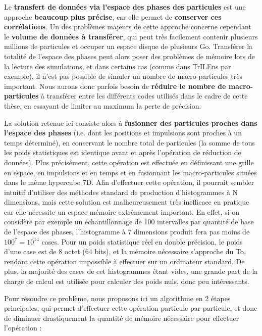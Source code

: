 \begin{refsection}
Le \textbf{transfert de données via l'espace des phases des particules} est une approche \textbf{beaucoup plus précise}, car elle permet de \textbf{conserver ces corrélations}. Un des problèmes majeurs de cette approche concerne cependant le \textbf{volume de données à transférer}, qui peut très facilement contenir plusieurs millions de particules et occuper un espace disque de plusieurs Go. Transférer la totalité de l'espace des phases peut alors poser des problèmes de mémoire lors de la lecture des simulations, et dans certains cas (comme dans TrILEns par exemple), il n'est pas possible de simuler un nombre de macro-particules très important. Nous aurons donc parfois besoin de \textbf{réduire le nombre de macro-particules} à transférer entre les différents codes utilisés dans le cadre de cette thèse, en essayant de limiter au maximum la perte de précision. %

La solution retenue ici consiste alors à \textbf{fusionner des particules proches dans l'espace des phases} (i.e. dont les positions et impulsions sont proches à un temps déterminé), en conservant le nombre total de particules (la somme de tous les poids statistiques est identique avant et après l'opération de réduction de données).
Plus précisément, cette opération est effectuée en définissant une grille en espace, en impulsions et en temps et en fusionnant les macro-particules situées dans le même hypercube 7D.
Afin d'effectuer cette opération, il pourrait sembler intuitif d'utiliser des méthodes standard de production d'histogrammes à N dimensions, mais cette solution est malheureusement très inefficace en pratique car elle nécessite un espace mémoire extrêmement important. En effet, si on considère par exemple un échantillonnage de 100 intervalles par quantité de base de l'espace des phases, l'histogramme à 7 dimensions produit fera pas moins de $100^7 = 10^{14}$ cases. Pour un poids statistique réel en double précision, le poids d'une case est de 8 octet (64 bits), et la mémoire nécessaire s'approche du To, rendant cette opération impossible à effectuer sur un ordinateur standard. De plus, la majorité des cases de cet histogrammes étant vides, une grande part de la charge de calcul est utilisée pour calculer des poids nuls, donc peu intéressants.

Pour résoudre ce problème, nous proposons ici un algorithme en 2 étapes principales, qui permet d'effectuer cette opération particule par particule, et donc de diminuer drastiquement la quantité de mémoire nécessaire pour effectuer l'opération :


\end{refsection}
